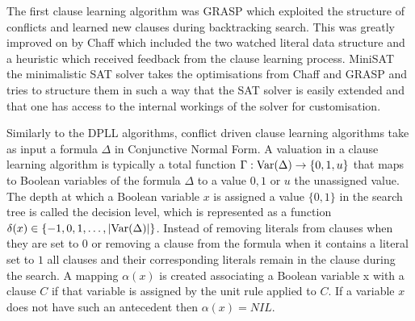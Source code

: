 The first clause learning algorithm was GRASP \cite{MS99,MS96} which exploited the structure of conflicts and learned new clauses during backtracking search. This was greatly improved on by Chaff \cite{LZ01} which included the two watched literal data structure and a heuristic which received feedback from the clause learning process. MiniSAT \cite{NE04} the minimalistic SAT solver takes the optimisations from Chaff and GRASP and tries to structure them in such a way that the SAT solver is easily extended and that one has access to the internal workings of the solver for customisation.

Similarly to the DPLL algorithms, conflict driven clause learning algorithms take as input a formula $\Delta$ in Conjunctive Normal Form. 
A valuation in a clause learning algorithm is typically a total function $\Gamma : \mathrm{Var}(\Delta) \to \{0,1,u\}$ that maps to Boolean variables of the formula $\Delta$ to a value $0,1$ or $u$ the unassigned value. The depth at which a Boolean variable $x$ is assigned a value $\{0,1\}$ in the search tree is called the decision level, which is represented as a function $\delta(x) \in \{-1,0,1, \ldots, |\mathrm{Var}(\Delta)| \} $. Instead of removing literals from clauses when they are set to $0$ or removing a clause from the formula when it contains a literal set to $1$ all clauses and their corresponding literals remain in the clause during the search. A mapping $\alpha(x)$ is created associating a Boolean variable x with a clause $C$ if that variable is assigned by the unit rule applied to $C$. If a variable $x$ does not have such an antecedent then $\alpha(x) = NIL$.

